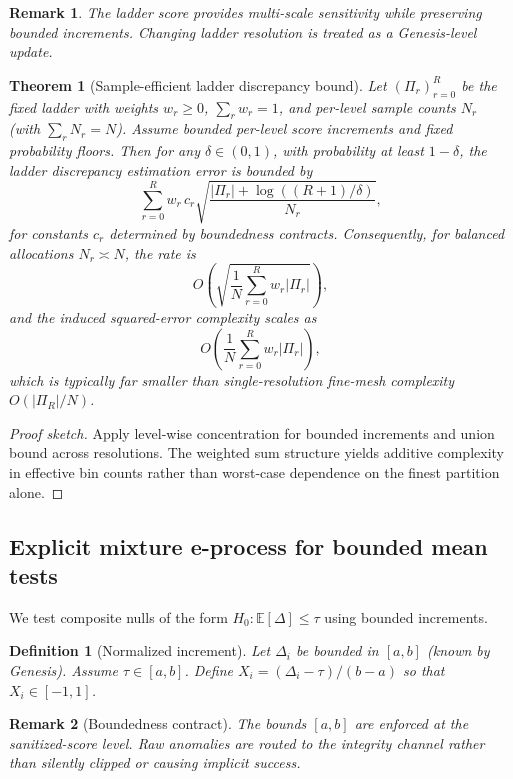 \documentclass[11pt,a4paper]{article}
\newtheorem{theorem}{Theorem}[section]
\newtheorem{definition}{Definition}[section]
\newtheorem{remark}{Remark}[section]
\begin{document}
\begin{remark}
The ladder score provides multi-scale sensitivity while preserving bounded increments.
Changing ladder resolution is treated as a Genesis-level update.
\end{remark}

\begin{theorem}[Sample-efficient ladder discrepancy bound]
\label{thm:ladder}
Let $(\Pi_r)_{r=0}^{R}$ be the fixed ladder with weights $w_r\ge0$, $\sum_r w_r=1$, and per-level sample counts $N_r$ (with $\sum_r N_r=N$).
Assume bounded per-level score increments and fixed probability floors.
Then for any $\delta\in(0,1)$, with probability at least $1-\delta$, the ladder discrepancy estimation error is bounded by
\[
\sum_{r=0}^{R} w_r\,c_r\sqrt{\frac{|\Pi_r|+\log((R+1)/\delta)}{N_r}},
\]
for constants $c_r$ determined by boundedness contracts.
Consequently, for balanced allocations $N_r\asymp N$, the rate is
\[
O\!\left(\sqrt{\frac{1}{N}\sum_{r=0}^{R}w_r|\Pi_r|}\right),
\]
and the induced squared-error complexity scales as
\[
O\!\left(\frac{1}{N}\sum_{r=0}^{R}w_r|\Pi_r|\right),
\]
which is typically far smaller than single-resolution fine-mesh complexity $O(|\Pi_R|/N)$.
\end{theorem}
\begin{proof}[Proof sketch]
Apply level-wise concentration for bounded increments and union bound across resolutions.
The weighted sum structure yields additive complexity in effective bin counts rather than worst-case dependence on the finest partition alone.
\end{proof}


\subsection{Explicit mixture e-process for bounded mean tests}
We test composite nulls of the form $H_0:\mathbb{E}[\Delta]\le \tau$ using bounded increments.

\begin{definition}[Normalized increment]
Let $\Delta_i$ be bounded in $[a,b]$ (known by Genesis).
Assume $\tau\in[a,b]$.
Define $X_i=(\Delta_i-\tau)/(b-a)$ so that $X_i\in[-1,1]$.
\end{definition}
\begin{remark}[Boundedness contract]
The bounds $[a,b]$ are enforced at the sanitized-score level.
Raw anomalies are routed to the integrity channel rather than silently clipped or causing implicit success.
\end{remark}
\end{document}
